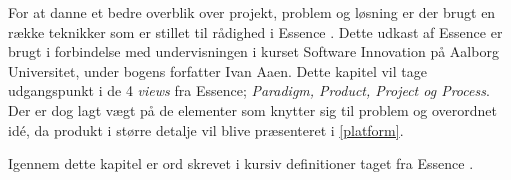 For at danne et bedre overblik over projekt, problem og løsning er der brugt en række teknikker som er stillet til rådighed i Essence \citep{art:essence}.
Dette udkast af Essence er brugt i forbindelse med undervisningen i kurset Software Innovation på Aalborg Universitet, under bogens forfatter Ivan Aaen.
Dette kapitel vil tage udgangspunkt i de 4 \textit{views} fra Essence; \textit{Paradigm, Product, Project og Process}.
Der er dog lagt vægt på de elementer som knytter sig til problem og overordnet idé, da produkt i større detalje vil blive præsenteret i \cref{platform}.

Igennem dette kapitel er ord skrevet i kursiv definitioner taget fra Essence \citep{art:essence}.
